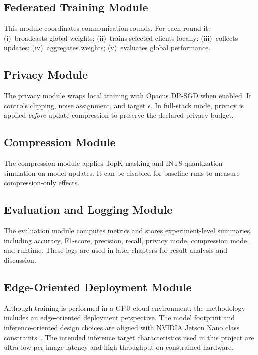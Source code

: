 \subsection{Federated Training Module}
This module coordinates communication rounds. For each round it:
(i)~broadcasts global weights; (ii)~trains selected clients locally;
(iii)~collects updates; (iv)~aggregates weights; (v)~evaluates global
performance.

\subsection{Privacy Module}
The privacy module wraps local training with Opacus DP-SGD when enabled. It
controls clipping, noise assignment, and target $\epsilon$. In full-stack
mode, privacy is applied \emph{before} update compression to preserve the
declared privacy budget.

\subsection{Compression Module}
The compression module applies TopK masking and INT8 quantization simulation
on model updates. It can be disabled for baseline runs to measure
compression-only effects.

\subsection{Evaluation and Logging Module}
The evaluation module computes metrics and stores experiment-level
summaries, including accuracy, F1-score, precision, recall, privacy mode,
compression mode, and runtime. These logs are used in later chapters for
result analysis and discussion.

\subsection{Edge-Oriented Deployment Module}
Although training is performed in a GPU cloud environment, the methodology
includes an edge-oriented deployment perspective. The model footprint and
inference-oriented design choices are aligned with NVIDIA Jetson Nano class
constraints~\cite{song2025edgecloud,shabarinath2025efficacy,memon2024edge}.
The intended inference target characteristics used in this project are
ultra-low per-image latency and high throughput on constrained hardware.

